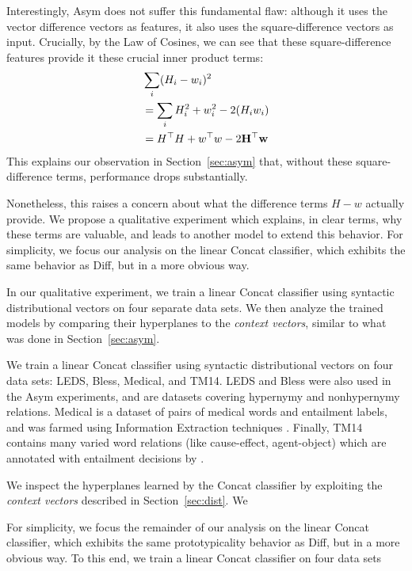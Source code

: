 \documentclass[12pt]{article}
\begin{document}
Interestingly, Asym does not suffer this fundamental flaw: although it uses
the vector difference vectors as features, it also uses the square-difference
vectors as input. Crucially, by the Law of Cosines, we can see that these
square-difference features provide it these crucial inner product terms:
\begin{align*}
  & \sum_i (H_i - w_i)^2\\
  & = \sum_i H_i^2 + w_i^2 - 2({H}_i{w}_i)\\
  & = H^\top H + w^\top w - 2{\bf H^\top{w}}
\end{align*}
This explains our observation in Section~\ref{sec:asym} that, without these
square-difference terms, performance drops substantially.

Nonetheless, this raises a concern about what the difference terms $H - w$
actually provide. We propose a qualitative experiment which explains, in
clear terms, why these terms are valuable, and leads to another model to
extend this behavior. For simplicity, we focus our analysis on the linear
Concat classifier, which exhibits the same behavior as Diff, but in a
more obvious way.

In our qualitative experiment, we train a linear Concat classifier using
syntactic distributional vectors on four separate data sets. We then analyze
the trained models by comparing their hyperplanes to the {\em context vectors},
similar to what was done in Section~\ref{sec:asym}.

We train a linear Concat classifier using syntactic distributional vectors
on four data sets: LEDS, Bless, Medical, and TM14. LEDS and Bless were also
used in the Asym experiments, and are datasets covering hypernymy and
nonhypernymy relations. Medical is a dataset of pairs of medical words and
entailment labels, and was farmed using Information Extraction techniques
\cite{levy:2014:conll}. Finally, TM14 contains many varied word relations
(like cause-effect, agent-object) which are annotated with entailment decisions
by .

We inspect the hyperplanes learned by the Concat classifier by exploiting
the {\em context vectors} described in Section~\ref{sec:dist}. We 

For simplicity, we focus the remainder of our analysis on
the linear Concat classifier, which exhibits the same prototypicality behavior
as Diff, but in a more obvious way. To this end, we train a linear Concat
classifier on four data sets
\end{document}

